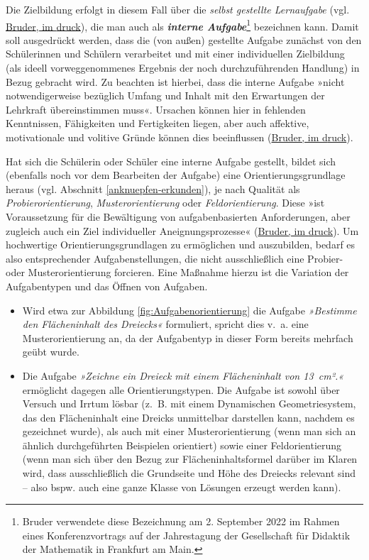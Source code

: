 \documentclass[
]{scrbook}
\providecommand{\tightlist}{%
  \setlength{\itemsep}{0pt}\setlength{\parskip}{0pt}}
\theoremstyle{definition}
\theoremstyle{definition}
\theoremstyle{definition}
\theoremstyle{definition}
\theoremstyle{remark}
\begin{document}
Die Zielbildung erfolgt in diesem Fall über die \emph{selbst gestellte Lernaufgabe} (vgl. \protect\hyperlink{ref-Bruderb}{Bruder, im {d}ruck}), die man auch als \textbf{\emph{interne Aufgabe}}\footnote{Bruder verwendete diese Bezeichnung am 2. September 2022 im Rahmen eines Konferenzvortrags auf der Jahrestagung der Gesellschaft für Didaktik der Mathematik in Frankfurt am Main.} bezeichnen kann. Damit soll ausgedrückt werden, dass die (von außen) gestellte Aufgabe zunächst von den Schülerinnen und Schülern verarbeitet und mit einer individuellen Zielbildung (als ideell vorweggenommenes Ergebnis der noch durchzuführenden Handlung) in Bezug gebracht wird. Zu beachten ist hierbei, dass die interne Aufgabe »nicht notwendigerweise bezüglich Umfang und Inhalt mit den Erwartungen der Lehrkraft übereinstimmen muss«. Ursachen können hier in fehlenden Kenntnissen, Fähigkeiten und Fertigkeiten liegen, aber auch affektive, motivationale und volitive Gründe können dies beeinflussen (\protect\hyperlink{ref-Bruderb}{Bruder, im {d}ruck}).

Hat sich die Schülerin oder Schüler eine interne Aufgabe gestellt, bildet sich (ebenfalls noch vor dem Bearbeiten der Aufgabe) eine Orientierungsgrundlage heraus (vgl. Abschnitt \ref{anknuepfen-erkunden}), je nach Qualität als \emph{Probierorientierung}, \emph{Musterorientierung} oder \emph{Feldorientierung}. Diese »ist Voraussetzung für die Bewältigung von aufgabenbasierten Anforderungen, aber zugleich auch ein Ziel individueller Aneignungsprozesse« (\protect\hyperlink{ref-Bruderb}{Bruder, im {d}ruck}). Um hochwertige Orientierungsgrundlagen zu ermöglichen und auszubilden, bedarf es also entsprechender Aufgabenstellungen, die nicht ausschließlich eine Probier- oder Musterorientierung forcieren. Eine Maßnahme hierzu ist die Variation der Aufgabentypen und das Öffnen von Aufgaben.

\begin{itemize}
\tightlist
\item
  Wird etwa zur Abbildung \ref{fig:Aufgabenorientierung} die Aufgabe \emph{»Bestimme den Flächeninhalt des Dreiecks«} formuliert, spricht dies v.~a. eine Musterorientierung an, da der Aufgabentyp in dieser Form bereits mehrfach geübt wurde.
\item
  Die Aufgabe \emph{»Zeichne ein Dreieck mit einem Flächeninhalt von 13~cm².«} ermöglicht dagegen alle Orientierungstypen. Die Aufgabe ist sowohl über Versuch und Irrtum lösbar (z.~B. mit einem Dynamischen Geometriesystem, das den Flächeninhalt eine Dreicks unmittelbar darstellen kann, nachdem es gezeichnet wurde), als auch mit einer Musterorientierung (wenn man sich an ähnlich durchgeführten Beispielen orientiert) sowie einer Feldorientierung (wenn man sich über den Bezug zur Flächeninhaltsformel darüber im Klaren wird, dass ausschließlich die Grundseite und Höhe des Dreiecks relevant sind -- also bspw. auch eine ganze Klasse von Lösungen erzeugt werden kann).
\end{itemize}
\end{document}
